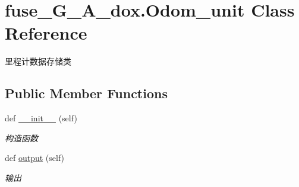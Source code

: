 \hypertarget{classfuse___g___a__dox_1_1_odom__unit}{}\section{fuse\+\_\+\+G\+\_\+\+A\+\_\+dox.\+Odom\+\_\+unit Class Reference}
\label{classfuse___g___a__dox_1_1_odom__unit}


里程计数据存储类  


\subsection*{Public Member Functions}
\begin{DoxyCompactItemize}
\item 
def \hyperlink{classfuse___g___a__dox_1_1_odom__unit_a8a0c348bf5b15910008f3d0677f6932b}{\+\_\+\+\_\+init\+\_\+\+\_\+} (self)
\begin{DoxyCompactList}\small\item\em 构造函数 \end{DoxyCompactList}\item 
def \hyperlink{classfuse___g___a__dox_1_1_odom__unit_af62561524085fe048e8991956e7ab573}{output} (self)
\begin{DoxyCompactList}\small\item\em 输出 \end{DoxyCompactList}\end{DoxyCompactItemize}

